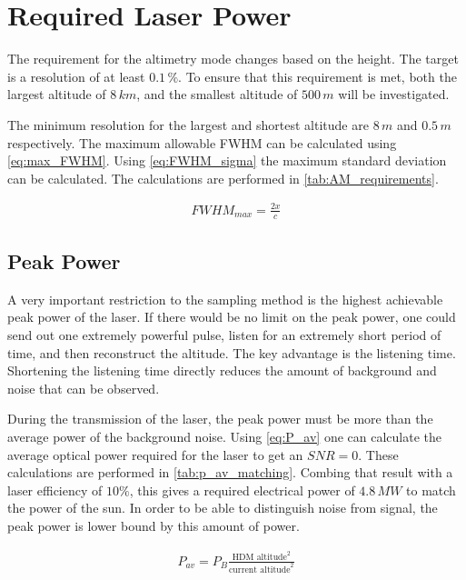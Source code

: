 \section{Required Laser Power} 
\label{ssec:required_laser_power}
The requirement for the altimetry mode changes based on the height. The target is a resolution of at least $0.1\,\%$. To ensure that this requirement is met, both the largest altitude of $8\,km$, and the smallest altitude of $500\,m$ will be investigated.

The minimum resolution for the largest and shortest altitude are $8\,m$ and $0.5\,m$ respectively. The maximum allowable FWHM can be calculated using \cref{eq:max_FWHM}.
 Using \cref{eq:FWHM_sigma} the maximum standard deviation can be calculated. The calculations are performed in \cref{tab:AM_requirements}.

\begin{align}\label{eq:max_FWHM}
FWHM_{max} = \frac{2x}{c}
\end{align}



\subsection{Peak Power}
A very important restriction to the sampling method is the highest achievable peak power of the laser. If there would be no limit on the peak power, one could send out one extremely powerful pulse, listen for an extremely short period of time, and then reconstruct the altitude. The key advantage is the listening time. Shortening the listening time directly reduces the amount of background and noise that can be observed. 

During the transmission of the laser, the peak power must be more than the average power of the background noise. Using \cref{eq:P_av} one can calculate the average optical power required for the laser to get an $SNR=0$. These calculations are performed in \cref{tab:p_av_matching}. Combing that result with a laser efficiency of $10\%$, this gives a required electrical power of $4.8\,MW$ to match the power of the sun. In order to be able to distinguish noise from signal, the peak power is lower bound by this amount of power.

\begin{align}\label{eq:P_av}
P_{av} = P_B\frac{\text{HDM altitude}^2}{\text{current altitude}^2}
\end{align} 




